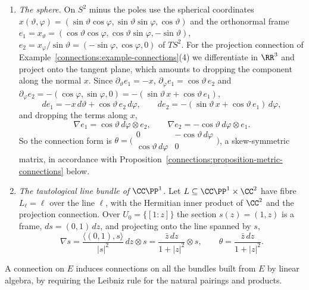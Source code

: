 \begin{example}\label{connections:example-connection-forms}
\begin{enumerate}
\item \emph{The sphere.} On $S^2$ minus the poles use the spherical coordinates $x(\vartheta, \varphi) = (\sin\vartheta\cos\varphi, \sin\vartheta\sin\varphi, \cos\vartheta)$ and the
orthonormal frame $e_1 = x_\vartheta = (\cos\vartheta\cos\varphi, \cos\vartheta\sin\varphi, -\sin\vartheta)$, $e_2 = x_\varphi/\sin\vartheta = (-\sin\varphi, \cos\varphi, 0)$ of $TS^2$.
For the projection connection of Example~\ref{connections:example-connections}(4) we differentiate in $\RR^3$ and project onto the tangent plane, which amounts to dropping
the component along the normal $x$. Since $\partial_\vartheta e_1 = -x$, $\partial_\varphi e_1 = \cos\vartheta\,e_2$ and $\partial_\varphi e_2 = -(\cos\varphi, \sin\varphi, 0)
= -(\sin\vartheta\,x + \cos\vartheta\,e_1)$,
\[
de_1 = -x\,d\vartheta + \cos\vartheta\,e_2\,d\varphi, \qquad de_2 = -(\sin\vartheta\,x + \cos\vartheta\,e_1)\,d\varphi,
\]
and dropping the terms along $x$,
\[
\nabla e_1 = \cos\vartheta\,d\varphi \otimes e_2, \qquad \nabla e_2 = -\cos\vartheta\,d\varphi \otimes e_1 .
\]
So the connection form is $\theta = \bigl(\begin{smallmatrix} 0 & -\cos\vartheta\,d\varphi\\ \cos\vartheta\,d\varphi & 0\end{smallmatrix}\bigr)$, a skew-symmetric matrix, in
accordance with Proposition~\ref{connections:proposition-metric-connections} below.
\item \emph{The tautological line bundle of $\CC\PP^1$.} Let $L \subseteq \CC\PP^1 \times \CC^2$ have fibre $L_\ell = \ell$ over the line $\ell$, with the Hermitian inner product of
$\CC^2$ and the projection connection. Over $U_0 = \{[1 : z]\}$ the section $s(z) = (1, z)$ is a frame, $ds = (0, 1)\,dz$, and projecting onto the line spanned by $s$,
\[
\nabla s = \frac{\langle(0, 1), s\rangle}{|s|^2}\,dz \otimes s = \frac{\bar z\,dz}{1 + |z|^2} \otimes s, \qquad \theta = \frac{\bar z\,dz}{1 + |z|^2} .
\]
\end{enumerate}
\end{example}

A connection on $E$ induces connections on all the bundles built from $E$ by linear algebra, by requiring the Leibniz rule for the natural pairings and products.

